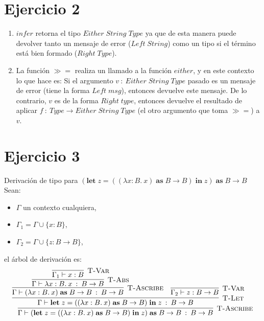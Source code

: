 \documentclass[a4paper]{article}
\begin{document}
\section*{Ejercicio 2}
\begin{enumerate}
\item $infer$ retorna el tipo $Either\; String\; Type$ ya que de esta
        manera puede devolver tanto un mensaje de error ($Left\; String$)
        como un tipo si el t\'ermino est\'a bien formado ($Right\; Type$).
\item La funci\'on $\gg =$ realiza un llamado a la funci\'on $either$, y en
        este contexto lo que hace es: Si el argumento $v\: :\: Either\;
        String\; Type$ pasado es un mensaje de error (tiene la forma
        $Left\; msg$), entonces devuelve este mensaje. De lo contrario,
        $v$ es de la forma $Right\; type$, entonces devuelve el resultado
        de aplicar $f\: :\: Type\rightarrow Either\; String\; Type$ (el
        otro argumento que toma $\gg =$) a $v$.
\end{enumerate}




\section*{Ejercicio 3}
Derivaci\'on de tipo para $(\textbf{let}\; z = ((\lambda x:B.\: x)\;
\textbf{as}\; B\rightarrow B)\; \textbf{in}\; z)\; \textbf{as}\;
B\rightarrow B$ \\
Sean:
\begin{itemize}
    \item $\Gamma$ un contexto cualquiera,
    \item $\Gamma_{1} = \Gamma \cup \{ x:B\}$,
    \item $\Gamma_{2} = \Gamma \cup \{ z:B\rightarrow B\}$,
\end{itemize}
el \'arbol de derivaci\'on es:
$$ \infer[\textsc{T-Ascribe}]
         {\Gamma \vdash (\textbf{let}\; z = ((\lambda x:B.\: x)\;
          \textbf{as}\; B\rightarrow B)\; \textbf{in}\; z)\;
          \textbf{as}\; B\rightarrow B\: :\: B\rightarrow B}
         {\infer[\textsc{T-Let}]
                {\Gamma \vdash \textbf{let}\; z = ((\lambda x:B.\:
                 x)\; \textbf{as}\; B\rightarrow B)\; \textbf{in}\;
                 z\: :\: B\rightarrow B}
                {\infer[\textsc{T-Ascribe}]
                       {\Gamma \vdash (\lambda x:B.\: x)\;
                        \textbf{as}\; B\rightarrow B\: :\:
                        B \rightarrow B}
                       {\infer[\textsc{T-Abs}]
                              {\Gamma \vdash \lambda x:B.\: x\:
                               :\: B\rightarrow B}
                              {\infer[\textsc{T-Var}]
                                     {\Gamma_{1} \vdash x:B}{}}
                       }
                 & \infer[\textsc{T-Var}]
                         {\Gamma_{2} \vdash z:B\rightarrow B}{}}
         }
$$
       
\end{document}
